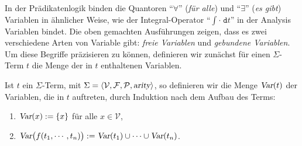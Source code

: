 In der Pr\"{a}dikatenlogik binden die Quantoren ``$\forall$'' ({\emph{\color{blue}f\"{u}r alle}}) und ``$\exists$''
({\emph{\color{blue}es gibt}}) Variablen in \"{a}hnlicher Weise,  wie der Integral-Operator ``$\int \cdot\; \mathtt{d}t$'' in
der Analysis Variablen bindet.  Die oben gemachten Ausf\"{u}hrungen zeigen, dass es zwei verschiedene Arten von 
Variable gibt: {\emph{\color{blue}freie Variablen}} und {\emph{\color{blue}gebundene Variablen}}.
Um diese Begriffe pr\"{a}zisieren zu k\"{o}nnen, definieren wir zun\"{a}chst f\"{u}r einen
$\Sigma$-Term $t$ die Menge der in $t$ enthaltenen Variablen.

\begin{Definition}[$\var(t)$]
    Ist $t$ ein $\Sigma$-Term, mit $\Sigma = \langle \mathcal{V}, \mathcal{F}, \mathcal{P}, \textsl{arity} \rangle$,
    so definieren wir die Menge $\var(t)$ der Variablen, die in $t$
    auftreten, durch Induktion nach dem Aufbau des Terms:
    \begin{enumerate}
    \item $\textsl{Var}(x) := \{ x \}$ \quad f\"{u}r alle $x \in \mathcal{V}$,
    \item $\textsl{Var}\bigl(f(t_1,\cdots,t_n)\bigr) := \textsl{Var}(t_1) \cup \cdots \cup \textsl{Var}(t_n)$.
          \eox
    \end{enumerate}
\end{Definition}


